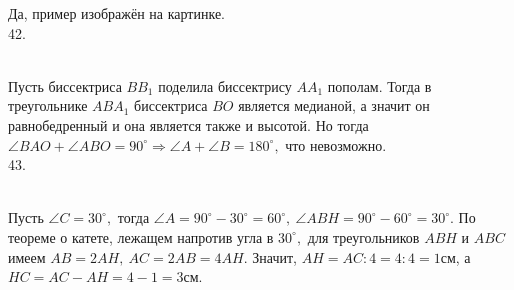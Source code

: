 \documentclass[12pt]{article}
\begin{document}
Да, пример изображён на картинке.\\
42. \begin{figure}[ht!]
\end{figure}\\
Пусть биссектриса $BB_1$ поделила биссектрису $AA_1$ пополам. Тогда в треугольнике $ABA_1$ биссектриса $BO$ является медианой, а значит он равнобедренный и она является также и высотой. Но тогда $\angle BAO+\angle ABO=90^\circ\Rightarrow \angle A+\angle B=180^\circ,$ что невозможно.\\
43. \begin{figure}[ht!]
\end{figure}\\
Пусть $\angle C=30^\circ,$ тогда $\angle A=90^\circ-30^\circ=60^\circ,\ \angle ABH=90^\circ-60^\circ=30^\circ.$ По теореме о катете, лежащем напротив угла в $30^\circ,$ для треугольников $ABH$ и $ABC$ имеем $AB=2AH,\ AC=2AB=4AH.$ Значит, $AH=AC:4=4:4=1$см, а $HC=AC-AH=4-1=3$см.\\
\end{document}
